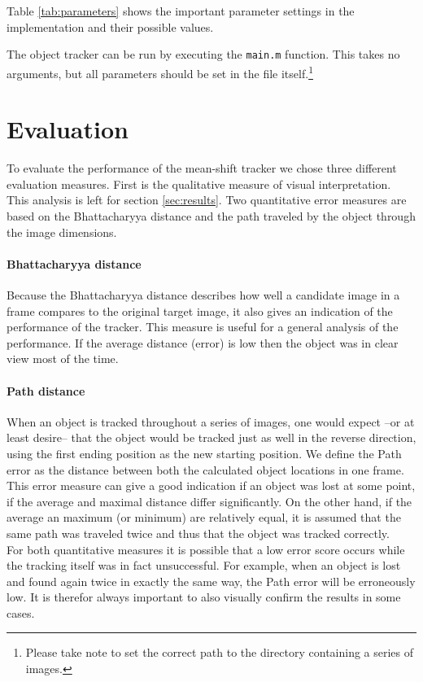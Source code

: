 \documentclass[a4paper,11pt]{article}
\begin{document}
Table \ref{tab:parameters} shows the important parameter settings in the implementation and their possible values.


The object tracker can be run by executing the \texttt{main.m} function.
This takes no arguments, but all parameters should be set in the file itself.\footnote{Please take note to set the correct path to the directory containing a series of images.}


\section{Evaluation}
\label{sec:evaluation}
To evaluate the performance of the mean-shift tracker we chose three different evaluation measures.
First is the qualitative measure of visual interpretation.
This analysis is left for section \ref{sec:results}.
Two quantitative error measures are based on the Bhattacharyya distance and the path traveled by the object through the image dimensions.

\paragraph{Bhattacharyya distance} Because the Bhattacharyya distance describes how well a candidate image in a frame compares to the original target image, it also gives an indication of the performance of the tracker.
This measure is useful for a general analysis of the performance.
If the average distance (error) is low then the object was in clear view most of the time.

\paragraph{Path distance} When an object is tracked throughout a series of images, one would expect --or at least desire-- that the object would be tracked just as well in the reverse direction, using the first ending position as the new starting position.
We define the Path error as the distance between both the calculated object locations in one frame.
This error measure can give a good indication if an object was lost at some point, if the average and maximal distance differ significantly.
On the other hand, if the average an maximum (or minimum) are relatively equal, it is assumed that the same path was traveled twice and thus that the object was tracked correctly.\\

For both quantitative measures it is possible that a low error score occurs while the tracking itself was in fact unsuccessful.
For example, when an object is lost and found again twice in exactly the same way, the Path error will be erroneously low.
It is therefor always important to also visually confirm the results in some cases.
\end{document}
